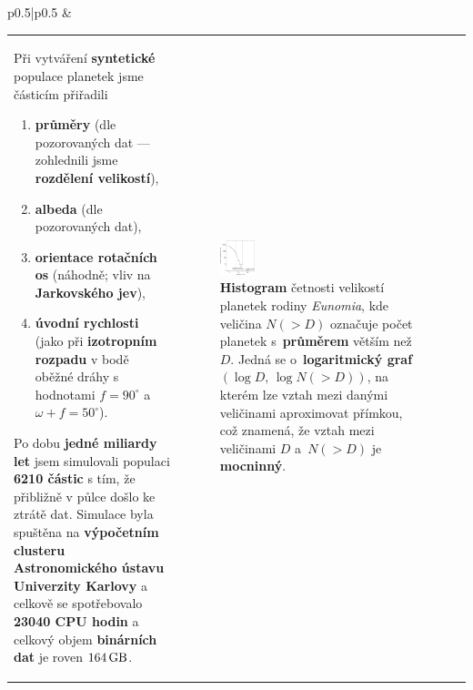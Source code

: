 \documentclass{beamer}
\newlength{\sep}
\newlength{\vyska}
\newlength{\vyskaB}
\newlength{\main}
\begin{document}
\begin{frame}
\begin{columns}[t]
\begin{column}{\main}
\begin{tcolorbox}[title=Výsledky\phantom{Úy},height=\vyskaB]
\begin{tabularx}{\textwidth}{p{}|p{}}
&

	\begin{tabularx}{\textwidth}{p{}X}

	Při vytváření \textbf{syntetické} populace planetek jsme částicím přiřadili 
	\begin{enumerate}
	\itemsep0em
	\item \textbf{průměry} (dle pozorovaných dat --- zohlednili jsme \textbf{rozdělení velikostí}), 
	\item \textbf{albeda} (dle pozorovaných dat),
	\item \textbf{orientace rotačních os} (náhodně; vliv na \textbf{Jarkovského jev}),
	\item \textbf{úvodní rychlosti} (jako při \textbf{izotropním rozpadu} v bodě oběžné dráhy s hodnotami $f=90^\circ$ a $\omega+f=50^\circ$).
	\end{enumerate}

	Po dobu \textbf{jedné miliardy let} jsem simulovali populaci \textbf{6210 částic} s tím, že přibližně v půlce došlo ke ztrátě dat. Simulace byla spuštěna na \textbf{výpočetním clusteru Astronomického ústavu Univerzity Karlovy} a celkově se spotřebovalo \textbf{23040 CPU hodin} a celkový objem \textbf{binárních dat} je roven $164\,{\rm GB}$.

		&

		\begin{figure}
			\centering
			\includegraphics[width=0.17\textwidth]{../obr/size_distribution-crop}
		\caption{\textbf{Histogram} četnosti velikostí planetek rodiny \textit{Eunomia}, kde veličina $N({>}D)$ označuje počet planetek s~\textbf{průměrem} větším než $D$. Jedná se o~\textbf{logaritmický graf} $(\log D,\,\log N({>}D))$, na kterém lze vztah mezi danými veličinami aproximovat přímkou, což znamená, že vztah mezi veličinami $D$ a~$N({>}D)$ je \textbf{mocninný}. }
			\label{fig:sfd}
		\end{figure}
		\end{tabularx}



\end{tabularx}
\end{tcolorbox}
\end{column}
\end{columns}
\end{frame}
\end{document}
